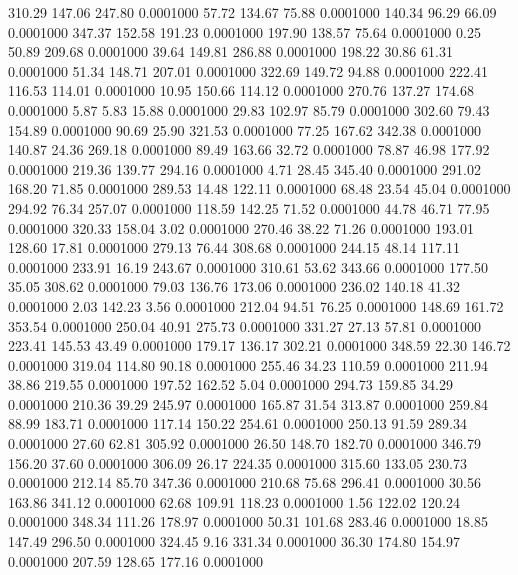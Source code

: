  310.29  147.06  247.80   0.0001000
  57.72  134.67   75.88   0.0001000
 140.34   96.29   66.09   0.0001000
 347.37  152.58  191.23   0.0001000
 197.90  138.57   75.64   0.0001000
   0.25   50.89  209.68   0.0001000
  39.64  149.81  286.88   0.0001000
 198.22   30.86   61.31   0.0001000
  51.34  148.71  207.01   0.0001000
 322.69  149.72   94.88   0.0001000
 222.41  116.53  114.01   0.0001000
  10.95  150.66  114.12   0.0001000
 270.76  137.27  174.68   0.0001000
   5.87    5.83   15.88   0.0001000
  29.83  102.97   85.79   0.0001000
 302.60   79.43  154.89   0.0001000
  90.69   25.90  321.53   0.0001000
  77.25  167.62  342.38   0.0001000
 140.87   24.36  269.18   0.0001000
  89.49  163.66   32.72   0.0001000
  78.87   46.98  177.92   0.0001000
 219.36  139.77  294.16   0.0001000
   4.71   28.45  345.40   0.0001000
 291.02  168.20   71.85   0.0001000
 289.53   14.48  122.11   0.0001000
  68.48   23.54   45.04   0.0001000
 294.92   76.34  257.07   0.0001000
 118.59  142.25   71.52   0.0001000
  44.78   46.71   77.95   0.0001000
 320.33  158.04    3.02   0.0001000
 270.46   38.22   71.26   0.0001000
 193.01  128.60   17.81   0.0001000
 279.13   76.44  308.68   0.0001000
 244.15   48.14  117.11   0.0001000
 233.91   16.19  243.67   0.0001000
 310.61   53.62  343.66   0.0001000
 177.50   35.05  308.62   0.0001000
  79.03  136.76  173.06   0.0001000
 236.02  140.18   41.32   0.0001000
   2.03  142.23    3.56   0.0001000
 212.04   94.51   76.25   0.0001000
 148.69  161.72  353.54   0.0001000
 250.04   40.91  275.73   0.0001000
 331.27   27.13   57.81   0.0001000
 223.41  145.53   43.49   0.0001000
 179.17  136.17  302.21   0.0001000
 348.59   22.30  146.72   0.0001000
 319.04  114.80   90.18   0.0001000
 255.46   34.23  110.59   0.0001000
 211.94   38.86  219.55   0.0001000
 197.52  162.52    5.04   0.0001000
 294.73  159.85   34.29   0.0001000
 210.36   39.29  245.97   0.0001000
 165.87   31.54  313.87   0.0001000
 259.84   88.99  183.71   0.0001000
 117.14  150.22  254.61   0.0001000
 250.13   91.59  289.34   0.0001000
  27.60   62.81  305.92   0.0001000
  26.50  148.70  182.70   0.0001000
 346.79  156.20   37.60   0.0001000
 306.09   26.17  224.35   0.0001000
 315.60  133.05  230.73   0.0001000
 212.14   85.70  347.36   0.0001000
 210.68   75.68  296.41   0.0001000
  30.56  163.86  341.12   0.0001000
  62.68  109.91  118.23   0.0001000
   1.56  122.02  120.24   0.0001000
 348.34  111.26  178.97   0.0001000
  50.31  101.68  283.46   0.0001000
  18.85  147.49  296.50   0.0001000
 324.45    9.16  331.34   0.0001000
  36.30  174.80  154.97   0.0001000
 207.59  128.65  177.16   0.0001000
